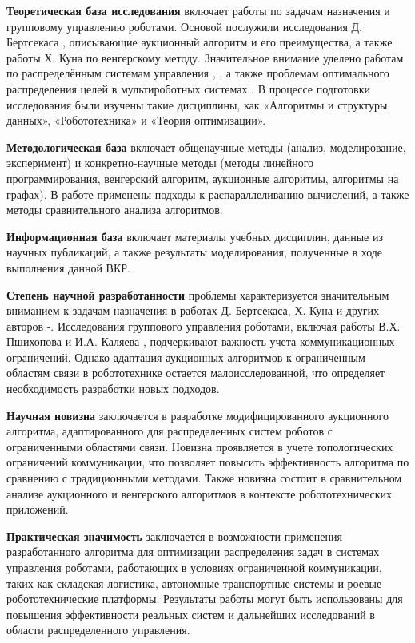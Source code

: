 \textbf{Теоретическая база исследования} включает работы по задачам назначения и групповому управлению роботами. Основой послужили исследования Д. Бертсекаса \cite{bertsekas1990}, описывающие аукционный алгоритм и его преимущества, а также работы Х. Куна \cite{kuhn1955} по венгерскому методу. Значительное внимание уделено работам по распределённым системам управления \cite{pshikhopov2015},  \cite{kalyaev2009}, а также проблемам оптимального распределения целей в мультироботных системах \cite{gerkey2003}. В процессе подготовки исследования были изучены такие дисциплины, как «Алгоритмы и структуры данных», «Робототехника» и «Теория оптимизации».

\textbf{Методологическая база} включает общенаучные методы (анализ, моделирование, эксперимент) и конкретно-научные методы (методы линейного программирования, венгерский алгоритм, аукционные алгоритмы, алгоритмы на графах). В работе применены подходы к распараллеливанию
 вычислений, а также методы сравнительного анализа алгоритмов.

\textbf{Информационная база} включает материалы учебных дисциплин, данные из научных публикаций, а также результаты моделирования, полученные в ходе выполнения данной ВКР.

\textbf{Степень научной разработанности} проблемы характеризуется значительным вниманием к задачам назначения в работах Д. Бертсекаса, Х. Куна и других авторов \cite{bertsekas1990}-\cite{gerkey2003}. Исследования группового управления роботами, включая работы В.Х. Пшихопова \cite{pshikhopov2015} и И.А. Каляева \cite{kalyaev2009}, подчеркивают важность учета коммуникационных ограничений. Однако адаптация аукционных алгоритмов к ограниченным областям связи в робототехнике остается малоисследованной, что определяет необходимость разработки новых подходов.

\textbf{Научная новизна} заключается в разработке модифицированного аукционного алгоритма, адаптированного для распределенных систем роботов с ограниченными областями связи. Новизна проявляется в учете топологических ограничений коммуникации, что позволяет повысить эффективность алгоритма по сравнению с традиционными методами. Также новизна состоит в сравнительном анализе аукционного и венгерского алгоритмов в контексте робототехнических приложений.

\textbf{Практическая значимость} заключается в возможности применения разработанного алгоритма для оптимизации распределения задач в системах управления роботами, работающих в условиях ограниченной коммуникации, таких как складская логистика, автономные транспортные системы и роевые робототехнические платформы. Результаты работы могут быть использованы для повышения эффективности реальных систем и дальнейших исследований в области распределенного управления.


